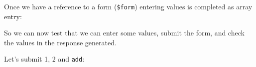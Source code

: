 \documentclass[a4paperpaper,openright]{book}
\newenvironment{Shaded}{}{}
\newcommand{\DecValTok}[1]{\textcolor[rgb]{0.25,0.63,0.44}{#1}}
\newcommand{\KeywordTok}[1]{\textcolor[rgb]{0.00,0.44,0.13}{\textbf{#1}}}
\newcommand{\NormalTok}[1]{#1}
\newcommand{\OtherTok}[1]{\textcolor[rgb]{0.00,0.44,0.13}{#1}}
\newcommand{\StringTok}[1]{\textcolor[rgb]{0.25,0.44,0.63}{#1}}
\begin{document}
Once we have a reference to a form (\texttt{\$form}) entering values is
completed as array entry:

\begin{Shaded}
\end{Shaded}

So we can now test that we can enter some values, submit the form, and
check the values in the response generated.

Let's submit 1, 2 and \texttt{add}:
\end{document}
